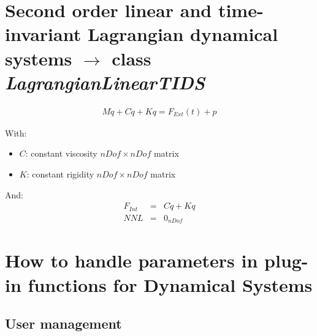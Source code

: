 \documentclass[10pt]{article}
\begin{document}
\section{Second order linear and time-invariant Lagrangian dynamical systems $\rightarrow$ class \textit{LagrangianLinearTIDS}}

\begin{eqnarray}
M \ddot q + C \dot q + K q =  F_{Ext}(t) + p
\end{eqnarray}

With:
\begin{itemize}
\item $C$: constant viscosity $nDof\times nDof$ matrix 
\item $K$: constant rigidity $nDof\times nDof$ matrix 
\end{itemize}

And: 
\begin{eqnarray}
F_{Int} &=& C \dot q + K q \\
NNL &=& 0_{nDof} 
\end{eqnarray}

\section{How to handle parameters in plug-in functions for Dynamical Systems}

\subsection{User management}
\end{document}
